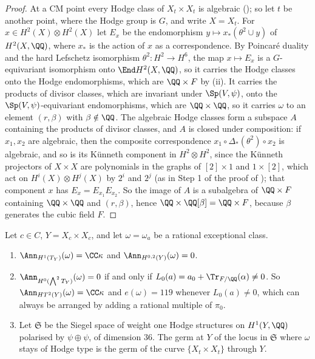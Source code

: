 \begin{proof}
At a CM point every Hodge class of $X_{t}\times X_{t}$ is algebraic
(); so let $t$ be another point, where the Hodge group is
$G$, and write $X=X_{t}$. For $x\in H^{2}(X)\otimes H^{2}(X)$ let $E_{x}$ be
the endomorphism $y\mapsto x_{*}(\theta^{2}\cup y)$ of $H^{2}(X,\QQ)$, where
$x_{*}$ is the action of $x$ as a correspondence. By Poincar\'e duality and
the hard Lefschetz isomorphism $\theta^{2}\colon H^{2}\to H^{6}$, the map
$x\mapsto E_{x}$ is a $G$-equivariant isomorphism onto $\End H^{2}(X,\QQ)$,
so it carries the Hodge classes onto the Hodge endomorphisms, which are
$\QQ\times F$ by (ii). It carries the products of
divisor classes, which are invariant under $\Sp(V,\psi)$, onto the
$\Sp(V,\psi)$-equivariant endomorphisms, which are $\QQ\times\QQ$, so it
carries $\omega$ to an element $(r,\beta)$ with $\beta\notin\QQ$. The
algebraic Hodge classes form a subspace $A$ containing the products of divisor
classes, and $A$ is closed under composition: if $x_{1},x_{2}$ are algebraic,
then the composite correspondence $x_{1}\circ\Delta_{*}(\theta^{2})\circ
x_{2}$ is algebraic, and so is its K\"unneth component in
$H^{2}\otimes H^{2}$, since the K\"unneth projectors of $X\times X$ are
polynomials in the graphs of $[2]\times1$ and $1\times[2]$, which act on
$H^{i}(X)\otimes H^{j}(X)$ by $2^{i}$ and $2^{j}$ (as in Step 1 of the proof
of ); that component $x$ has
$E_{x}=E_{x_{1}}E_{x_{2}}$. So the image of $A$ is a subalgebra of
$\QQ\times F$ containing $\QQ\times\QQ$ and $(r,\beta)$, hence
$\QQ\times\QQ[\beta]=\QQ\times F$, because $\beta$ generates the cubic
field $F$.
\end{proof}

\begin{theorem}\label{thm:mumfordrigid}
Let $c\in C$, $Y=X_{c}\times X_{c}$, and let $\omega=\omega_{a}$ be a
rational exceptional class.
\begin{enumerate}[label=\textup{(\roman*)},leftmargin=2.6em,itemsep=2pt]
\item $\Ann_{H^{1}(T_{Y})}(\omega)=\CC\kappa$ and
  $\Ann_{H^{0,2}(Y)}(\omega)=0$.
\item $\Ann_{H^{0}(\bigwedge^{2}T_{Y})}(\omega)=0$ if and only if
  $L_{0}(a)=a_{0}+\Tr_{F/\QQ}(\alpha)\ne0$. So
  $\Ann_{HT^{2}(Y)}(\omega)=\CC\kappa$ and $e(\omega)=119$ whenever
  $L_{0}(a)\ne0$, which can always be arranged by adding a rational multiple
  of $\pi_{0}$.
\item Let $\mathfrak{S}$ be the Siegel space of weight one Hodge structures on
  $H^{1}(Y,\QQ)$ polarised by $\psi\oplus\psi$, of dimension $36$. The germ at
  $Y$ of the locus in $\mathfrak{S}$ where $\omega$ stays of Hodge type is the
  germ of the curve $\{X_{t}\times X_{t}\}$ through $Y$.
\end{enumerate}
\end{theorem}

